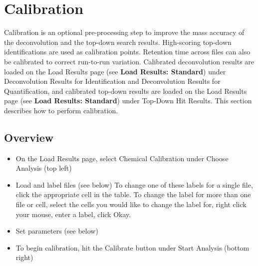
\section{Calibration}

Calibration is an optional pre-processing step to improve the mass accuracy of the deconvolution and the top-down search results.\supercite{Solntsev2018,Schaffer2018b} High-scoring top-down identifications are used as calibration points. Retention time across files can also be calibrated to correct run-to-run variation. Calibrated deconvolution results are loaded on the Load Results page (see \textbf{Load Results: Standard}) under Deconvolution Results for Identification and Deconvolution Results for Quantification, and calibrated top-down results are loaded on the Load Results page (see \textbf{Load Results: Standard}) under Top-Down Hit Results. This section describes how to perform calibration.

\subsection{Overview}
\begin{itemize}
\item On the Load Results page, select Chemical Calibration under Choose Analysis (top left)
\item Load and label files (see below)
\subitem To change one of these labels for a single file, click the appropriate cell in the table. To change the label for more than one file or cell, select the cells you would like to change the label for, right click your mouse, enter a label, click Okay. 
\item Set parameters (see below)
\item To begin calibration, hit the Calibrate button under Start Analysis (bottom right)
\end{itemize}

